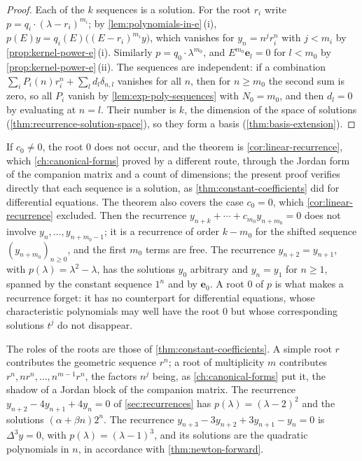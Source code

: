\begin{proof}
Each of the $k$ sequences is a solution. For the root $r_i$ write $p=q_i\cdot(\lambda-r_i)^{m_i}$; by \cref{lem:polynomials-in-e}\,(i), $p(E)y=q_i(E)\bigl((E-r_i)^{m_i}y\bigr)$, which vanishes for $y_n=n^jr_i^n$ with $j<m_i$ by \cref{prop:kernel-power-e}\,(i). Similarly $p=q_0\cdot\lambda^{m_0}$, and $E^{m_0}\mathbf e_l=0$ for $l<m_0$ by \cref{prop:kernel-power-e}\,(ii). The sequences are independent: if a combination $\sum_iP_i(n)r_i^n+\sum_ld_l\delta_{n,l}$ vanishes for all $n$, then for $n\ge m_0$ the second sum is zero, so all $P_i$ vanish by \cref{lem:exp-poly-sequences} with $N_0=m_0$, and then $d_l=0$ by evaluating at $n=l$. Their number is $k$, the dimension of the space of solutions (\cref{thm:recurrence-solution-space}), so they form a basis (\cref{thm:basis-extension}).
\end{proof}

If $c_0\ne0$, the root $0$ does not occur, and the theorem is \cref{cor:linear-recurrence}, which \cref{ch:canonical-forms} proved by a different route, through the Jordan form of the companion matrix and a count of dimensions; the present proof verifies directly that each sequence is a solution, as \cref{thm:constant-coefficients} did for differential equations. The theorem also covers the case $c_0=0$, which \cref{cor:linear-recurrence} excluded. Then the recurrence $y_{n+k}+\cdots+c_{m_0}y_{n+m_0}=0$ does not involve $y_n,\ldots,y_{n+m_0-1}$; it is a recurrence of order $k-m_0$ for the shifted sequence $(y_{n+m_0})_{n\ge0}$, and the first $m_0$ terms are free. The recurrence $y_{n+2}=y_{n+1}$, with $p(\lambda)=\lambda^2-\lambda$, has the solutions $y_0$ arbitrary and $y_n=y_1$ for $n\ge1$, spanned by the constant sequence $1^n$ and by $\mathbf e_0$. A root $0$ of $p$ is what makes a recurrence forget: it has no counterpart for differential equations, whose characteristic polynomials may well have the root $0$ but whose corresponding solutions $t^j$ do not disappear.

The roles of the roots are those of \cref{thm:constant-coefficients}. A simple root $r$ contributes the geometric sequence $r^n$; a root of multiplicity $m$ contributes $r^n,nr^n,\ldots,n^{m-1}r^n$, the factors $n^j$ being, as \cref{ch:canonical-forms} put it, the shadow of a Jordan block of the companion matrix. The recurrence $y_{n+2}-4y_{n+1}+4y_n=0$ of \cref{sec:recurrences} has $p(\lambda)=(\lambda-2)^2$ and the solutions $(\alpha+\beta n)2^n$. The recurrence $y_{n+3}-3y_{n+2}+3y_{n+1}-y_n=0$ is $\Delta^3y=0$, with $p(\lambda)=(\lambda-1)^3$, and its solutions are the quadratic polynomials in $n$, in accordance with \cref{thm:newton-forward}.

